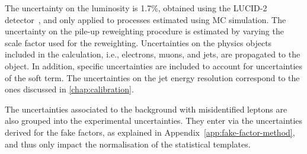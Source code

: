 The uncertainty on the luminosity is 1.7\%, obtained using the LUCID-2 detector~\cite{ATLAS-CONF-2019-021}, and only applied to processes estimated using MC simulation. 
The uncertainty on the pile-up reweighting procedure is estimated by varying the scale factor used for the reweighting. 
Uncertainties on the physics objects included in the \MET calculation, i.e., electrons, muons, and jets, are propagated to the \MET object. In addition, specific \MET uncertainties are included to account for uncertainties of the \MET soft term.
The uncertainties on the jet energy resolution correspond to the ones discussed in \cref{chap:calibration}. 

The uncertainties associated to the background with misidentified leptons are also grouped into the experimental uncertainties. They enter via the uncertainties derived for the fake factors, as explained in Appendix~\ref{app:fake-factor-method}, and thus only impact the normalisation of the statistical templates. 

